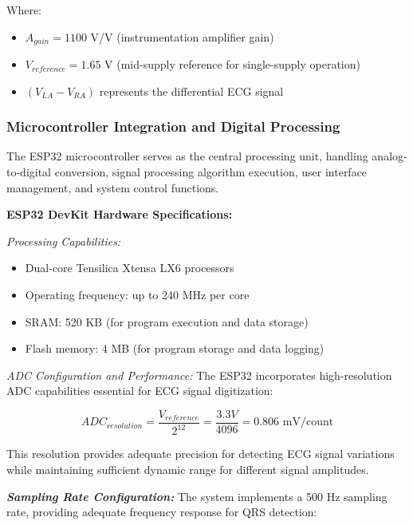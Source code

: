 \documentclass[12pt,a4paper]{article}
\begin{document}
Where:
\begin{itemize}
\item $A_{gain} = 1100$ V/V (instrumentation amplifier gain)
\item $V_{reference} = 1.65$ V (mid-supply reference for single-supply operation)
\item $(V_{LA} - V_{RA})$ represents the differential ECG signal
\end{itemize}

\subsubsection{Microcontroller Integration and Digital Processing}

The ESP32 microcontroller serves as the central processing unit, handling analog-to-digital conversion, signal processing algorithm execution, user interface management, and system control functions.

\vspace{0.5cm}

\textbf{ESP32 DevKit Hardware Specifications:}

\textit{Processing Capabilities:}
\begin{itemize}
\item Dual-core Tensilica Xtensa LX6 processors
\item Operating frequency: up to 240 MHz per core
\item SRAM: 520 KB (for program execution and data storage)
\item Flash memory: 4 MB (for program storage and data logging)
\end{itemize}

\textit{ADC Configuration and Performance:}
The ESP32 incorporates high-resolution ADC capabilities essential for ECG signal digitization:

\begin{equation*}
ADC_{resolution} = \frac{V_{reference}}{2^{12}} = \frac{3.3V}{4096} = 0.806 \text{ mV/count}
\end{equation*}

This resolution provides adequate precision for detecting ECG signal variations while maintaining sufficient dynamic range for different signal amplitudes.

\vspace{0.3cm}

\textbf{\textit{Sampling Rate Configuration:}}
The system implements a 500 Hz sampling rate, providing adequate frequency response for QRS detection:
\end{document}
